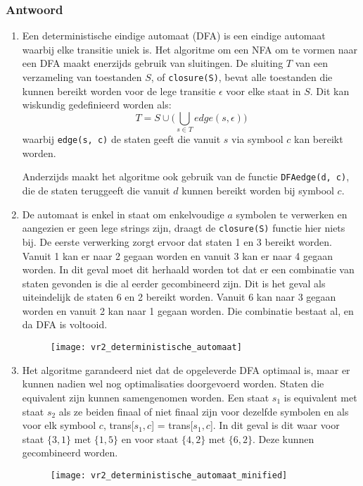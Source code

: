\documentclass{report}
\newcommand{\answer}[1]{
		\subsubsection*{Antwoord}
			#1
}
\begin{document}
	\answer{
	\begin{enumerate}
		\item Een deterministische eindige automaat (DFA) is een eindige automaat waarbij elke transitie uniek is. Het algoritme om een NFA om te vormen naar een DFA maakt enerzijds gebruik van sluitingen. De sluiting $T$ van een verzameling van toestanden $S$, of \texttt{closure(S)}, bevat alle toestanden die kunnen bereikt worden voor de lege transitie $\epsilon$ voor elke staat in $S$. Dit kan wiskundig gedefinieerd worden als:
		$$T = S \cup \bigg(\bigcup_{s \in T} edge(s, \epsilon) \bigg)$$
		waarbij \texttt{edge(s, c)} de staten geeft die vanuit $s$ via symbool $c$ kan bereikt worden.
		
		Anderzijds maakt het algoritme ook gebruik van de functie \texttt{DFAedge(d, c)}, die de staten teruggeeft die vanuit $d$ kunnen bereikt worden bij symbool $c$.
		
		\todo{verder uitleggen}
		
		\item De automaat is enkel in staat om enkelvoudige $a$ symbolen te verwerken en aangezien er geen lege strings zijn, draagt de \texttt{closure(S)} functie hier niets bij. De eerste verwerking zorgt ervoor dat staten 1 en 3 bereikt worden. Vanuit 1 kan er naar 2 gegaan worden en vanuit 3 kan er naar 4 gegaan worden. In dit geval moet dit herhaald worden tot dat er een combinatie van staten gevonden is die al eerder gecombineerd zijn. Dit is het geval als uiteindelijk de staten 6 en 2 bereikt worden. Vanuit 6 kan naar 3 gegaan worden en vanuit 2 kan naar 1 gegaan worden. Die combinatie bestaat al, en da DFA is voltooid.
			
		\begin{figure}[ht]
			\centering
			\texttt{[image: vr2\_deterministische\_automaat]}
		\end{figure}
	
		\item Het algoritme garandeerd niet dat de opgeleverde DFA optimaal is, maar er kunnen nadien wel nog optimalisaties doorgevoerd worden. Staten die equivalent zijn kunnen samengenomen worden. Een staat $s_1$ is equivalent met staat $s_2$ als ze beiden finaal of niet finaal zijn voor dezelfde symbolen en als voor elk symbool $c$, trans[$s_1, c$] = trans[$s_1, c$]. In dit geval is dit waar voor staat $\{3, 1\}$ met $\{1, 5\}$ en voor staat $\{4, 2\}$ met $\{6, 2\}$. Deze kunnen gecombineerd worden.
		
		\begin{figure}[ht]
			\centering
			\texttt{[image: vr2\_deterministische\_automaat\_minified]}
		\end{figure}
		
		
	\end{enumerate}	
}
\end{document}
